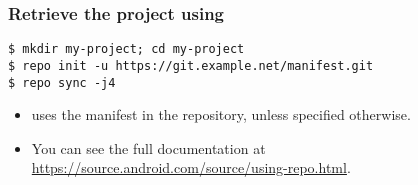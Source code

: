 \begin{frame}[fragile]
  \frametitle{Retrieve the project using }
  \begin{verbatim}
$ mkdir my-project; cd my-project
$ repo init -u https://git.example.net/manifest.git
$ repo sync -j4
  \end{verbatim}
  \begin{itemize}
    \item {} uses the  manifest in the
    repository, unless specified otherwise.
    \item You can see the full  documentation at
      \url{https://source.android.com/source/using-repo.html}.
  \end{itemize}
\end{frame}
